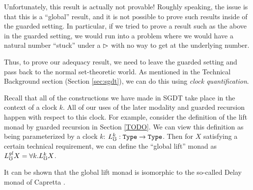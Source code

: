 Unfortunately, this result is actually not provable!
Roughly speaking, the issue is that this is a ``global'' result, and it is not possible
to prove such results inside of the guarded setting. 
In particular, if we tried to prove a result such as the above in the guarded setting,
we would run into a problem where we would have a natural number ``stuck'' under a $\vartriangleright$
with no way to get at the underlying number.

Thus, to prove our adequacy result, we need to leave the guarded setting and pass back
to the normal set-theoretic world.
As mentioned in the Technical Background section (Section \ref{sec:sgdt}), we can do this
using \emph{clock quantification}.

Recall that all of the constructions we have made in SGDT take place in the context of a clock $k$.
All of our uses of the later modality and guarded recursion happen with respect to this clock.
For example, consider the definition of the lift monad by guarded recursion in Section \ref{TODO}.
We can view this definition as being parameterized by a clock $k$: $L_\mho^k : \texttt{Type} \to \texttt{Type}$.
Then for $X$ satisfying a certain technical requirement, we can define the ``global lift'' monad as $L_\mho^{gl} X = \forall k. L_\mho^k X$.


It can be shown that the global lift monad is isomorphic to the so-called Delay monad of Capretta \cite{TODO}.



